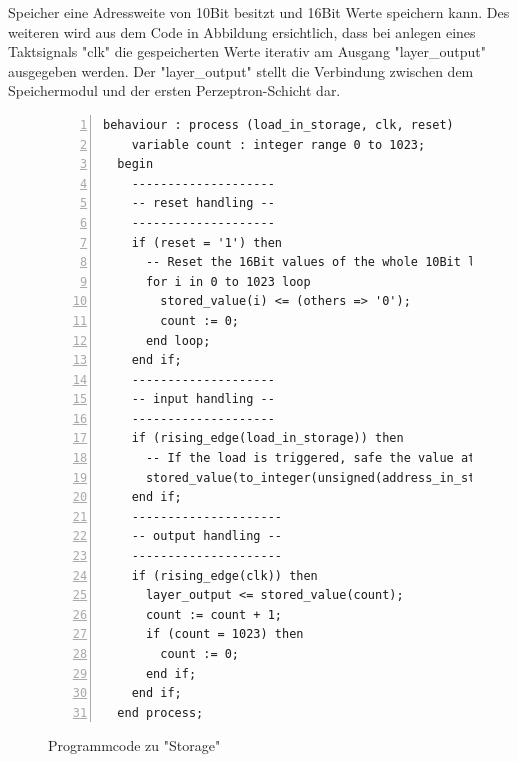 \documentclass{article}
\numberwithin{equation}{section}
\begin{document}
Speicher eine Adressweite von 10Bit besitzt und 16Bit Werte speichern kann. Des weiteren 
wird aus dem Code in Abbildung ersichtlich, dass bei anlegen eines Taktsignals  "clk" 
die gespeicherten Werte iterativ am Ausgang "layer\_output" ausgegeben werden. Der 
"layer\_output" stellt  die Verbindung zwischen dem Speichermodul und der ersten 
Perzeptron-Schicht dar.
\begin{figure}[htbp]
\begin{lstlisting}[style=VHDL,numbers=left,stepnumber=1,basicstyle=\footnotesize]
    behaviour : process (load_in_storage, clk, reset)
    variable count : integer range 0 to 1023;
  begin
    --------------------
    -- reset handling --
    --------------------
    if (reset = '1') then
      -- Reset the 16Bit values of the whole 10Bit long array.
      for i in 0 to 1023 loop
        stored_value(i) <= (others => '0');
        count := 0;
      end loop;
    end if;
    --------------------
    -- input handling --
    --------------------
    if (rising_edge(load_in_storage)) then
      -- If the load is triggered, safe the value at the address.
      stored_value(to_integer(unsigned(address_in_storage))) <= data_in_storage;
    end if;
    ---------------------
    -- output handling --
    ---------------------
    if (rising_edge(clk)) then
      layer_output <= stored_value(count);
      count := count + 1;
      if (count = 1023) then
        count := 0;
      end if;
    end if;
  end process;
\end{lstlisting}
\caption{Programmcode zu "Storage"} \label{code:storage}
\end{figure}
\pagebreak
\end{document}

